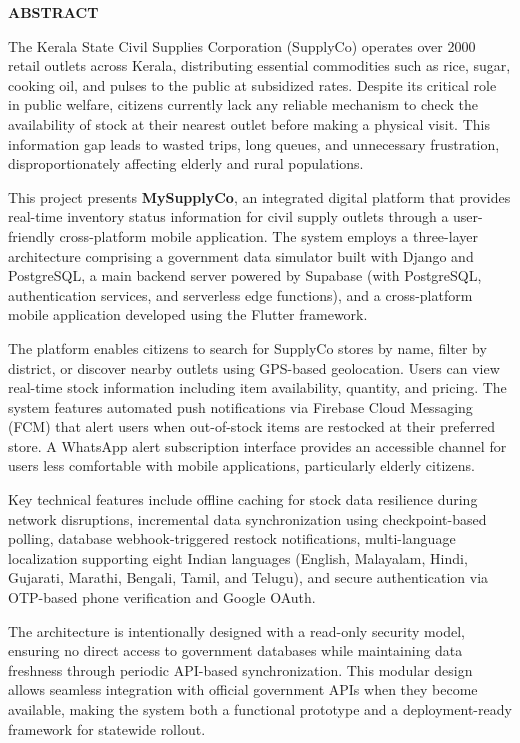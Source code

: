 \begin{center}
{\LARGE \textbf{ABSTRACT}}
\end{center}

\vspace{1cm}

The Kerala State Civil Supplies Corporation (SupplyCo) operates over 2000 retail outlets across Kerala, distributing essential commodities such as rice, sugar, cooking oil, and pulses to the public at subsidized rates. Despite its critical role in public welfare, citizens currently lack any reliable mechanism to check the availability of stock at their nearest outlet before making a physical visit. This information gap leads to wasted trips, long queues, and unnecessary frustration, disproportionately affecting elderly and rural populations.

This project presents \textbf{MySupplyCo}, an integrated digital platform that provides real-time inventory status information for civil supply outlets through a user-friendly cross-platform mobile application. The system employs a three-layer architecture comprising a government data simulator built with Django and PostgreSQL, a main backend server powered by Supabase (with PostgreSQL, authentication services, and serverless edge functions), and a cross-platform mobile application developed using the Flutter framework.

The platform enables citizens to search for SupplyCo stores by name, filter by district, or discover nearby outlets using GPS-based geolocation. Users can view real-time stock information including item availability, quantity, and pricing. The system features automated push notifications via Firebase Cloud Messaging (FCM) that alert users when out-of-stock items are restocked at their preferred store. A WhatsApp alert subscription interface provides an accessible channel for users less comfortable with mobile applications, particularly elderly citizens.

Key technical features include offline caching for stock data resilience during network disruptions, incremental data synchronization using checkpoint-based polling, database webhook-triggered restock notifications, multi-language localization supporting eight Indian languages (English, Malayalam, Hindi, Gujarati, Marathi, Bengali, Tamil, and Telugu), and secure authentication via OTP-based phone verification and Google OAuth.

The architecture is intentionally designed with a read-only security model, ensuring no direct access to government databases while maintaining data freshness through periodic API-based synchronization. This modular design allows seamless integration with official government APIs when they become available, making the system both a functional prototype and a deployment-ready framework for statewide rollout.

